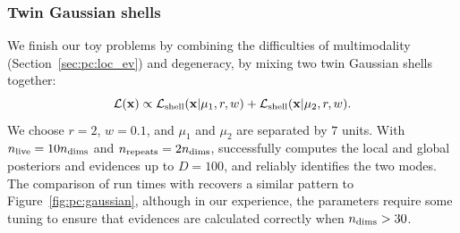 \subsubsection{Twin Gaussian shells}
We finish our toy problems by combining the difficulties of multimodality (Section~\ref{sec:pc:loc_ev}) and degeneracy, by mixing two twin Gaussian shells together:
\begin{equation}
  \mathcal{L}(\mathbf{x}) \propto \mathcal{L}_{\mathrm{shell}}(\mathbf{x}|\mathbf{\mu}_1,r,w) + \mathcal{L}_{\mathrm{shell}}(\mathbf{x}|\mathbf{\mu}_2,r,w).
  \label{eqn:pc:gaussian_shells}
\end{equation}
We choose $r=2$, $w=0.1$, and $\mu_1$ and $\mu_2$ are separated by $7$ units. With $n_{\mathrm{live}}=10n_{\mathrm{dims}}$ and $n_{\mathrm{repeats}}=2n_{\mathrm{dims}}$, \PolyChord{} successfully computes the local and global posteriors and evidences up to $D=100$, and reliably identifies the two modes. The comparison of run times with \MultiNest{} recovers a similar pattern to Figure~\ref{fig:pc:gaussian}, although in our experience, the \MultiNest{} parameters require some tuning to ensure that evidences are calculated correctly when $n_{\mathrm{dims}}>30$.


\subsection{\CosmoChord}
\label{sec:pc:cosmochord}

